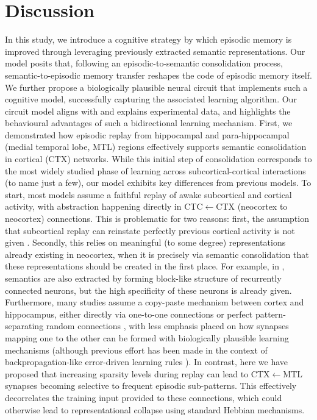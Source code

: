 \documentclass{article}
\begin{document}
\section*{Discussion}
In this study, we introduce a cognitive strategy by which episodic memory is improved through leveraging previously extracted semantic representations. Our model posits that, following an episodic-to-semantic consolidation process, semantic-to-episodic memory transfer reshapes the code of episodic memory itself. We further propose a biologically plausible neural circuit that implements such a cognitive model, successfully capturing the associated learning algorithm. Our circuit model aligns with and explains experimental data, and highlights the behavioural advantages of such a bidirectional learning mechanism.
\newline\newline
First, we demonstrated how episodic replay from hippocampal and para-hippocampal (medial temporal lobe, MTL) regions effectively supports semantic consolidation in cortical (CTX) networks. While this initial step of consolidation corresponds to the most widely studied phase of learning across subcortical-cortical interactions  (to name just a few), our model exhibits key differences from previous models. To start, most models assume a faithful replay of awake subcortical and cortical activity, with abstraction happening directly in CTC$\leftarrow$CTX (neocortex to neocortex) connections. This is problematic for two reasons: first, the assumption that subcortical replay can reinstate perfectly previous cortical activity is not given . Secondly, this relies on meaningful (to some degree) representations already existing in neocortex, when it is precisely via semantic consolidation that these representations should be created in the first place. For example, in , semantics are also extracted by forming block-like structure of recurrently connected neurons, but the high specificity of these neurons is already given. Furthermore, many studies assume a copy-paste mechanism between cortex and hippocampus, either directly via one-to-one connections  or perfect pattern-separating random connections , with less emphasis placed on how synapses mapping one to the other can be formed with biologically plausible learning mechanisms (although previous effort has been made in the context of backpropagation-like error-driven learning rules ). In contrast, here we have proposed that increasing sparsity levels during replay can lead to CTX$\leftarrow$MTL synapses becoming selective to frequent episodic sub-patterns. This effectively decorrelates the training input provided to these connections, which could otherwise lead to representational collapse using standard Hebbian mechanisms. 
\end{document}
